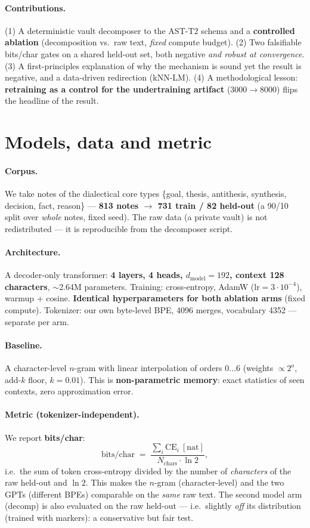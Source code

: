 \documentclass[11pt]{article}
\begin{document}
\paragraph{Contributions.} (1) A deterministic vault decomposer to the AST-T2 schema and a \textbf{controlled
ablation} (decomposition vs.\ raw text, \emph{fixed} compute budget). (2) Two falsifiable bits/char gates on a
shared held-out set, both negative \emph{and robust at convergence}. (3) A first-principles explanation of why the
mechanism is sound yet the result is negative, and a data-driven redirection (kNN-LM). (4) A methodological lesson:
\textbf{retraining as a control for the undertraining artifact} (3000$\to$8000) flips the headline of the result.

\section{Models, data and metric}
\paragraph{Corpus.} We take notes of the dialectical core types \{goal, thesis, antithesis, synthesis, decision,
fact, reason\} --- \textbf{813 notes $\to$ 731 train / 82 held-out} (a 90/10 split over \emph{whole} notes, fixed
seed). The raw data (a private vault) is not redistributed --- it is reproducible from the decomposer script.

\paragraph{Architecture.} A decoder-only transformer: \textbf{4 layers, 4 heads, $d_\text{model}=192$, context 128
characters}, $\sim$2.64M parameters. Training: cross-entropy, AdamW ($\text{lr}=3\cdot10^{-4}$), warmup + cosine.
\textbf{Identical hyperparameters for both ablation arms} (fixed compute). Tokenizer: our own byte-level BPE,
4096 merges, vocabulary 4352 --- separate per arm.

\paragraph{Baseline.} A character-level $n$-gram with linear interpolation of orders $0\ldots6$ (weights $\propto
2^o$, add-$k$ floor, $k=0.01$). This is \textbf{non-parametric memory}: exact statistics of seen contexts, zero
approximation error.

\paragraph{Metric (tokenizer-independent).} We report \textbf{bits/char}:
\[
\text{bits/char} \;=\; \frac{\sum_i \text{CE}_i\ [\text{nat}]}{N_\text{chars}\cdot \ln 2},
\]
i.e.\ the sum of token cross-entropy divided by the number of \emph{characters} of the raw held-out and $\ln 2$.
This makes the $n$-gram (character-level) and the two GPTs (different BPEs) comparable on the \emph{same} raw text.
The second model arm (decomp) is also evaluated on the raw held-out --- i.e.\ slightly \emph{off} its distribution
(trained with markers): a conservative but fair test.
\end{document}
